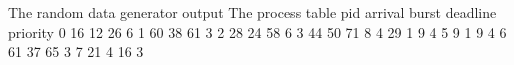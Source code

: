 
 The random data generator output
	The process table 
pid      arrival            burst        deadline     priority    
0        16                 12           26           6           
1        60                 38           61           3           
2        28                 24           58           6           
3        44                 50           71           8           
4        29                 1            9            4           
5        9                  1            9            4           
6        61                 37           65           3           
7        21                 4            16           3           
